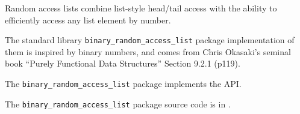 
Random access lists combine list-style head/tail 
access with the ability to efficiently access any 
list element by number.

The standard library {\tt binary\_random\_access\_list} package  
implementation of them is inspired by binary 
numbers, and comes from Chris Okasaki's seminal book 
``Purely Functional Data Structures'' Section 9.2.1 (p119).

The {\tt binary\_random\_access\_list} package implements the  API.

The {\tt binary\_random\_access\_list} package source code is in .




